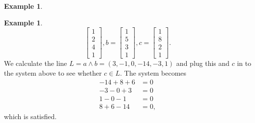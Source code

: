 \documentclass[a4paper,12pt]{book}
\theoremstyle{plain}
\theoremstyle{definition}
\newtheorem{Example}[equation]{Example}
\begin{document}
\begin{Example}
\begin{Example}
\[\begin{bmatrix}
				1 \\ 2 \\ 4 \\ 1
			\end{bmatrix}, b = \begin{bmatrix}
				1 \\ 5 \\ 3 \\ 1
			\end{bmatrix}, c = \begin{bmatrix}
				1 \\ 8 \\ 2 \\ 1
			\end{bmatrix}.
		\]
		We calculate the line \( L = a \wedge b = (3, -1, 0, -14, -3, 1) \) and plug this and
		\( c \) in to the system above to see whether \( c \in L \). The system becomes
		\begin{align*}
			-14 + 8 + 6 &= 0 \\
			-3 - 0 + 3 &= 0 \\
			1 - 0 - 1 &= 0 \\
			8 + 6 - 14 &= 0,
		\end{align*}
		which is satisfied.
	\end{Example}
\end{Example}
\end{document}
